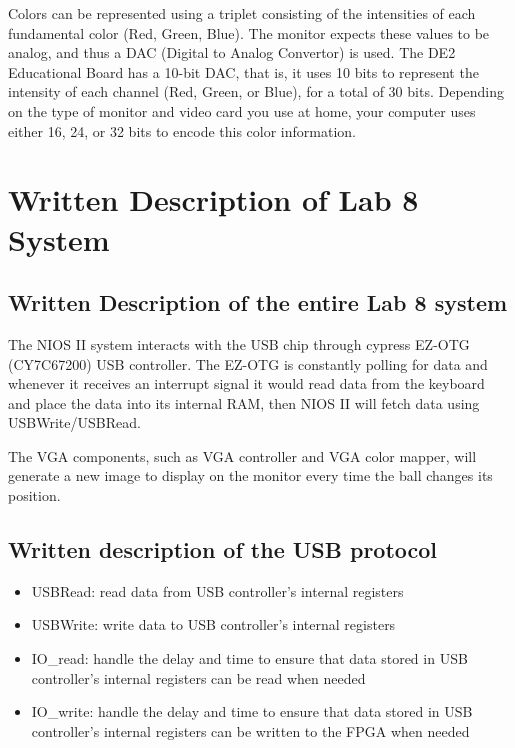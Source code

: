 \documentclass[11pt]{article}
\begin{document}
Colors can be represented using a triplet consisting of the intensities of each fundamental color (Red, Green, Blue). The monitor expects these values to be analog, and thus a DAC (Digital to Analog Convertor) is used. The DE2 Educational Board has a 10-bit DAC, that is, it uses 10 bits to represent the intensity of each channel (Red, Green, or Blue), for a total of 30 bits. Depending on the type of monitor and video card you use at home, your computer uses either 16, 24, or 32 bits to encode this color information.


\section{Written Description of Lab 8 System}
\subsection{Written Description of the entire Lab 8 system}
The NIOS II system interacts with the USB chip through cypress EZ-OTG (CY7C67200) USB controller. The EZ-OTG is constantly polling for data and whenever it receives an interrupt signal it would read data from the keyboard and place the data into its internal RAM, then NIOS II will fetch data using USBWrite/USBRead.

The VGA components, such as VGA controller and VGA color mapper, will generate a new image to display on the monitor every time the ball changes its position.
\subsection{Written description of the USB protocol}
\begin{itemize}
    \item USBRead: read data from USB controller's internal registers
    \item USBWrite: write data to USB controller's internal registers
    \item IO\_read: handle the delay and time to ensure that data stored in USB controller's internal registers can be read when needed
    \item IO\_write: handle the delay and time to ensure that data stored in USB controller's internal registers can be written to the FPGA when needed
\end{itemize}
\end{document}
